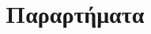 \documentclass[assignment3.tex]{subfiles}
\begin{document}
\section*{Παραρτήματα}
%
%
%
%
%
\end{document}
